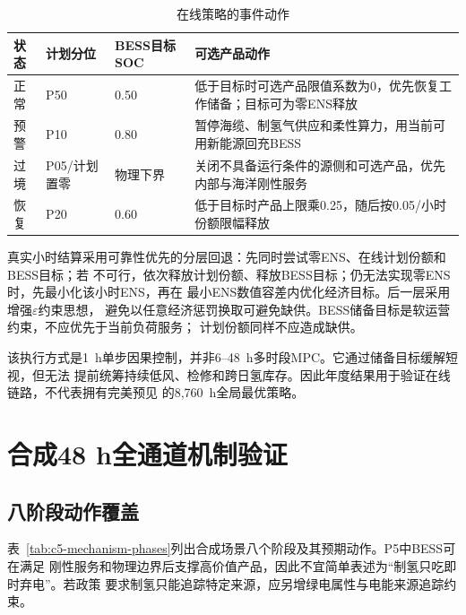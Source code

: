 \begin{table}[htbp]
\centering
\caption{在线策略的事件动作}
\label{tab:c5-event-policy}
\begin{tabularx}{\textwidth}{p{2.2cm}p{1.8cm}p{2.2cm}X}
\toprule
状态 & 计划分位 & BESS目标SOC & 可选产品动作\\
\midrule
正常 & P50 & 0.50 & 低于目标时可选产品限值系数为0，优先恢复工作储备；目标可为零ENS释放\\
预警 & P10 & 0.80 & 暂停海缆、制氢气供应和柔性算力，用当前可用新能源回充BESS\\
过境 & P05/计划置零 & 物理下界 & 关闭不具备运行条件的源侧和可选产品，优先内部与海洋刚性服务\\
恢复 & P20 & 0.60 & 低于目标时产品上限乘0.25，随后按0.05/小时份额限幅释放\\
\bottomrule
\end{tabularx}
\end{table}

真实小时结算采用可靠性优先的分层回退：先同时尝试零ENS、在线计划份额和BESS目标；若
不可行，依次释放计划份额、释放BESS目标；仍无法实现零ENS时，先最小化该小时ENS，再在
最小ENS数值容差内优化经济目标。后一层采用增强$\varepsilon$约束思想\cite{mavrotas2009}，
避免以任意经济惩罚换取可避免缺供。BESS储备目标是软运营约束，不应优先于当前负荷服务；
计划份额同样不应造成缺供。

该执行方式是1~h单步因果控制，并非6--48~h多时段MPC。它通过储备目标缓解短视，但无法
提前统筹持续低风、检修和跨日氢库存。因此年度结果用于验证在线链路，不代表拥有完美预见
的8,760~h全局最优策略。

\section{合成48 h全通道机制验证}

\subsection{八阶段动作覆盖}

表~\ref{tab:c5-mechanism-phases}列出合成场景八个阶段及其预期动作。P5中BESS可在满足
刚性服务和物理边界后支撑高价值产品，因此不宜简单表述为“制氢只吃即时弃电”。若政策
要求制氢只能追踪特定来源，应另增绿电属性与电能来源追踪约束。

